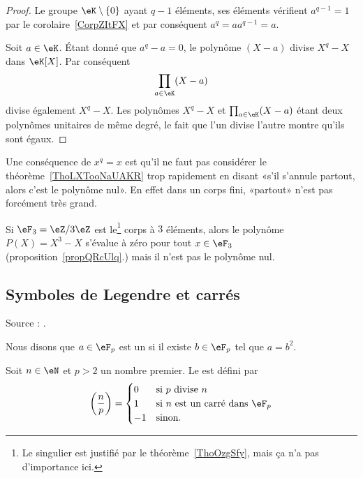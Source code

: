 \begin{proof}
	Le groupe \( \eK\setminus\{ 0 \}\) ayant \( q-1\) éléments, ses éléments vérifient \( a^{q-1}=1\) par le corolaire~\ref{CorpZItFX} et par conséquent \( a^q=aa^{q-1}=a \).

	Soit \( a\in \eK\). Étant donné que \( a^q-a=0\), le polynôme \( (X-a)\) divise \( X^q-X\) dans \( \eK[X]\). Par conséquent
	\begin{equation}
		\prod_{a\in \eK}(X-a)
	\end{equation}
	divise également \( X^q-X\). Les polynômes \( X^q-X\) et \( \prod_{a\in \eK}(X-a)\) étant deux polynômes unitaires de même degré, le fait que l'un divise l'autre montre qu'ils sont égaux.
\end{proof}

Une conséquence de \( x^q=x\) est qu'il ne faut pas considérer le théorème~\ref{ThoLXTooNaUAKR} trop rapidement en disant «s'il s'annule partout, alors c'est le polynôme nul». En effet dans un corps fini, «partout» n'est pas forcément très grand.

\begin{example}\label{exVQBooBMPLkD}
	Si \( \eF_3=\eZ/3\eZ\) est le\footnote{Le singulier est justifié par le théorème~\ref{ThoOzgSfy}, mais ça n'a pas d'importance ici.} corps à \( 3\)
	éléments, alors le polynôme \( P(X)=X^3-X\) s'évalue à zéro pour tout \( x\in \eF_3\) (proposition~\ref{propQRcUlq}.) mais il n'est pas le polynôme nul.
\end{example}

\subsection{Symboles de Legendre et carrés}

Source : \cite{RecQuadVento}.

Nous disons que \( a\in \eF_p\) est un  si il existe \( b\in \eF_p\) tel que \( a=b^2\).

\begin{definition}
	Soit \( n\in \eN\) et \( p>2\) un nombre premier. Le  est défini par
	\begin{equation}
		\left( \frac{ n }{ p } \right)=\begin{cases}
			0  & \text{si } p\text{ divise } n                \\
			1  & \text{si } n\text{ est un carré dans } \eF_p \\
			-1 & \text{sinon}.
		\end{cases}
	\end{equation}
\end{definition}


